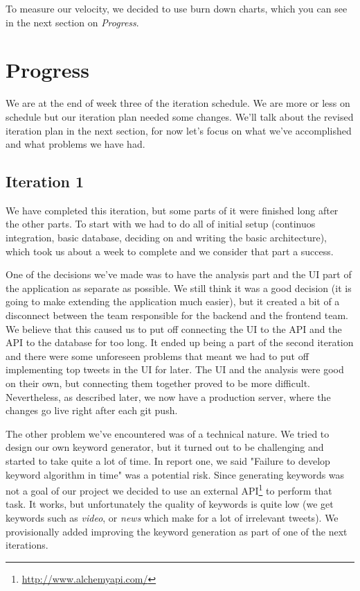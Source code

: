 \documentclass[a4paper,12pt]{article}
\begin{document}
	To measure our velocity, we decided to use burn down charts, which you can see in the next section on \emph{Progress}.
	
	\section{Progress}
	We are at the end of week three of the iteration schedule. We are more or less on schedule but our iteration plan needed some changes. We'll talk about the revised iteration plan in the next section, for now let's focus on what we've accomplished and what problems we have had.
	
	\subsection{Iteration 1}
	We have completed this iteration, but some parts of it were finished long after the other parts. To start with we had to do all of initial setup (continuos integration, basic database, deciding on and writing the basic architecture), which took us about a week to complete and we consider that part a success.
	
	One of the decisions we've made was to have the analysis part and the UI part of the application as separate as possible. We still think it was a good decision (it is going to make extending the application much easier), but it created a bit of a disconnect between the team responsible for the backend and the frontend team. We believe that this caused us to put off connecting the UI to the API and the API to the database for too long. It ended up being a part of the second iteration and there were some unforeseen problems that meant we had to put off implementing top tweets in the UI for later. The UI and the analysis were good on their own, but connecting them together proved to be more difficult. Nevertheless, as described later, we now have a production server, where the changes go live right after each git push.
	
	The other problem we've encountered was of a technical nature. We tried to design our own keyword generator, but it turned out to be challenging and started to take quite a lot of time. In report one, we said "Failure to develop keyword algorithm in time" was a potential risk. Since generating keywords was not a goal of our project we decided to use an external API\footnote{\url{http://www.alchemyapi.com/}} to perform that task. It works, but unfortunately the quality of keywords is quite low (we get keywords such as \emph{video}, or \emph{news} which make for a lot of irrelevant tweets). We provisionally added improving the keyword generation as part of one of the next iterations.
	
\end{document}
